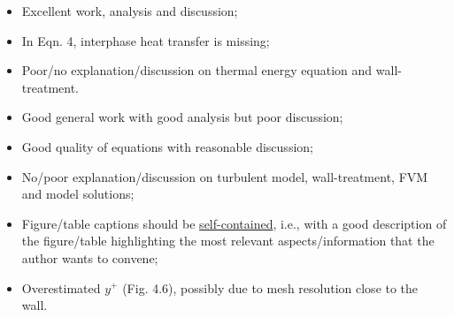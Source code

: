 \documentclass[14pt,twoside]{report}
\newcommand\blankpage{%
    \null
    \thispagestyle{empty}%
    \addtocounter{page}{-1}%
    \newpage}
\begin{document}
\clearpage 



\bigskip


\medskip

  \begin{itemize}
%
     \item Excellent work, analysis and discussion;
     \item In Eqn. 4, interphase heat transfer is missing; 
     \item Poor/no explanation/discussion on thermal energy equation and wall-treatment.
%
  \end{itemize}%

\clearpage 



\bigskip


\medskip

  \begin{itemize}
%
     \item Good general work with good analysis but poor discussion;
     \item Good quality of equations with reasonable discussion;
     \item No/poor explanation/discussion on turbulent model, wall-treatment, FVM and model solutions;
     \item Figure/table captions should be \underline{self-contained}, i.e., with a good description of the figure/table highlighting the most relevant aspects/information that the author wants to convene;
     \item Overestimated $y^{+}$ (Fig. 4.6), possibly due to mesh resolution close to the wall.
%
  \end{itemize}%

\clearpage 





\bigskip
\end{document}
